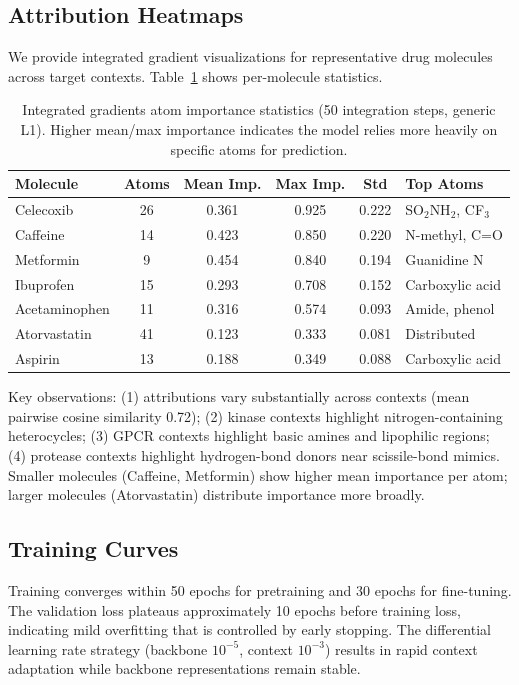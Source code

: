 \documentclass[sigconf]{acmart}
\begin{document}
\subsection{Attribution Heatmaps}

We provide integrated gradient visualizations for representative drug molecules across target contexts. Table~\ref{tab:attribution} shows per-molecule statistics.

\begin{table}[h]
\caption{Integrated gradients atom importance statistics (50 integration steps, generic L1). Higher mean/max importance indicates the model relies more heavily on specific atoms for prediction.}
\label{tab:attribution}
\centering
\small
\begin{tabular}{@{}lccccl@{}}
\toprule
Molecule & Atoms & Mean Imp. & Max Imp. & Std & Top Atoms \\
\midrule
Celecoxib & 26 & 0.361 & 0.925 & 0.222 & SO$_2$NH$_2$, CF$_3$ \\
Caffeine & 14 & 0.423 & 0.850 & 0.220 & N-methyl, C=O \\
Metformin & 9 & 0.454 & 0.840 & 0.194 & Guanidine N \\
Ibuprofen & 15 & 0.293 & 0.708 & 0.152 & Carboxylic acid \\
Acetaminophen & 11 & 0.316 & 0.574 & 0.093 & Amide, phenol \\
Atorvastatin & 41 & 0.123 & 0.333 & 0.081 & Distributed \\
Aspirin & 13 & 0.188 & 0.349 & 0.088 & Carboxylic acid \\
\bottomrule
\end{tabular}
\end{table}

Key observations: (1) attributions vary substantially across contexts (mean pairwise cosine similarity 0.72); (2) kinase contexts highlight nitrogen-containing heterocycles; (3) GPCR contexts highlight basic amines and lipophilic regions; (4) protease contexts highlight hydrogen-bond donors near scissile-bond mimics. Smaller molecules (Caffeine, Metformin) show higher mean importance per atom; larger molecules (Atorvastatin) distribute importance more broadly.

\subsection{Training Curves}

Training converges within 50 epochs for pretraining and 30 epochs for fine-tuning. The validation loss plateaus approximately 10 epochs before training loss, indicating mild overfitting that is controlled by early stopping. The differential learning rate strategy (backbone $10^{-5}$, context $10^{-3}$) results in rapid context adaptation while backbone representations remain stable.
\end{document}
